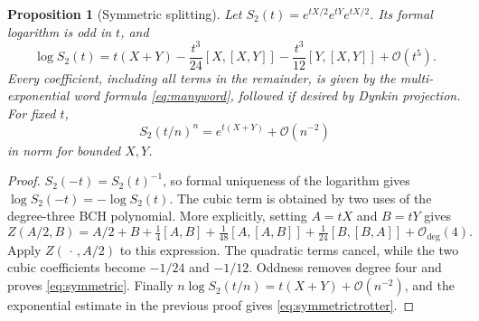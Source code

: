 \documentclass[11pt]{article}
\newtheorem{proposition}[theorem]{Proposition}
\theoremstyle{definition}
\theoremstyle{remark}
\newcommand{\smallO}{\mathcal O}
\numberwithin{equation}{section}
\begin{document}
\begin{proposition}[Symmetric splitting]\label{prop:symmetric}
Let $S_2(t)=e^{tX/2}e^{tY}e^{tX/2}$. Its formal logarithm is odd in $t$, and
\begin{equation}\label{eq:symmetric}
 \log S_2(t)=t(X+Y)-\frac{t^3}{24}[X,[X,Y]]
                        -\frac{t^3}{12}[Y,[X,Y]]+\smallO(t^5).
\end{equation}
Every coefficient, including all terms in the remainder, is given by the multi-exponential word formula \eqref{eq:manyword}, followed if desired by Dynkin projection. For fixed $t$,
\begin{equation}\label{eq:symmetrictrotter}
 S_2(t/n)^n=e^{t(X+Y)}+\smallO(n^{-2})
\end{equation}
in norm for bounded $X,Y$.
\end{proposition}
\begin{proof}
$S_2(-t)=S_2(t)^{-1}$, so formal uniqueness of the logarithm gives $\log S_2(-t)=-\log S_2(t)$. The cubic term is obtained by two uses of the degree-three BCH polynomial. More explicitly, setting $A=tX$ and $B=tY$ gives
\[
 Z(A/2,B)=A/2+B+\tfrac14[A,B]
       +\tfrac1{48}[A,[A,B]]+\tfrac1{24}[B,[B,A]]
       +\smallO_{\deg}(4).
\]
Apply $Z(\,\cdot\,,A/2)$ to this expression. The quadratic terms cancel, while the two cubic coefficients become $-1/24$ and $-1/12$. Oddness removes degree four and proves \eqref{eq:symmetric}. Finally $n\log S_2(t/n)=t(X+Y)+\smallO(n^{-2})$, and the exponential estimate in the previous proof gives \eqref{eq:symmetrictrotter}.
\end{proof}
\end{document}
